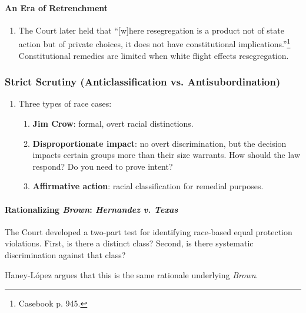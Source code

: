 \paragraph{An Era of Retrenchment}

\begin{enumerate}
    \item The Court later held that ``[w]here resegregation is a product not 
    of state action but of private choices, it does not have constitutional 
    implications.''\footnote{Casebook p. 945.} Constitutional remedies are 
    limited when white flight effects resegregation.
\end{enumerate}

\subsubsection{Strict Scrutiny (Anticlassification vs. Antisubordination)}

\begin{enumerate}
    \item Three types of race cases:
    \begin{enumerate}
        \item \textbf{Jim Crow}: formal, overt racial distinctions.
        \item \textbf{Disproportionate impact}: no overt discrimination, but 
        the decision impacts certain groups more than their size warrants. How 
        should the law respond? Do you need to prove intent?
        \item \textbf{Affirmative action}: racial classification for remedial 
        purposes.
    \end{enumerate}
\end{enumerate}

\paragraph{Rationalizing \emph{Brown}: \emph{Hernandez v. Texas}}

The Court developed a two-part test for identifying race-based equal 
protection violations. First, is there a distinct class? Second, is there 
systematic discrimination against that class?

Haney-L\'{o}pez argues that this is the same rationale underlying 
\emph{Brown}.

